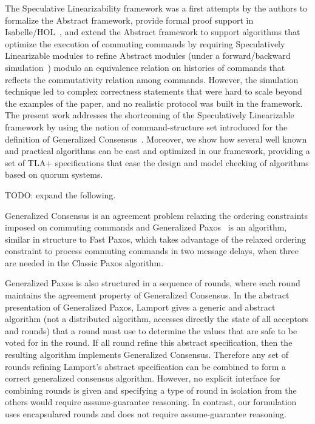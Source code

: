 The Speculative Linearizability framework was a
first attempts by the authors to formalize the Abstract framework, provide
formal proof support in Isabelle/HOL~\cite{NipkowPaulsonWenzel02IsabelleHOL},
and extend the Abstract framework to support algorithms that optimize
the execution of commuting commands by requiring Speculatively
Linearizable modules to refine Abstract modules (under a forward/backward
simulation~\cite{LynchVaandrager95ForwardBackwardSimulationsIUntimedSystems})
modulo an equivalence relation on histories of commands that reflects the
commutativity relation among commands. However, the simulation technique led to
complex correctness statements that were hard to scale beyond the examples of
the paper, and no realistic protocol was built in the framework. The present
work addresses the shortcoming of the Speculatively Linearizable framework by
using the notion of command-structure set introduced for the definition of
Generalized Consensus~\cite{Lamport05GeneralizeConsensus}. Moreover, we show how
several well known and practical algorithms can be cast and optimized in our
framework, providing a set of TLA+ specifications that ease the design and model
checking of algorithms based on quorum systems.

TODO\@: expand the following.

Generalized Consensus is an agreement problem relaxing the ordering constraints
imposed on commuting commands and Generalized Paxos~\cite{Lamport05GeneralizeConsensus} is an algorithm, similar
in structure to Fast Paxos, which takes advantage of the relaxed ordering
constraint to process commuting commands in two message delays, when three are
needed in the Classic Paxos algorithm.

Generalized Paxos is also structured in a sequence of rounds, 
where each round maintains the agreement property of Generalized Consensus.
In the abstract presentation of Generalized Paxos, Lamport gives a generic and abstract algorithm (not a distributed algorithm, accesses directly the state of all acceptors and rounds) that a round must use to determine the values that are safe to be voted for in the round.
If all round refine this abstract specification, then the resulting algorithm implements Generalized Consensus. Therefore any set of rounds refining Lamport's abstract specification can be combined to form a correct generalized consensus algorithm.  
However, no explicit interface for combining rounds is given and specifying a type of round in isolation from the others would require assume-guarantee reasoning. In contrast, our formulation uses encapsulared rounds and does not require assume-guarantee reasoning.

